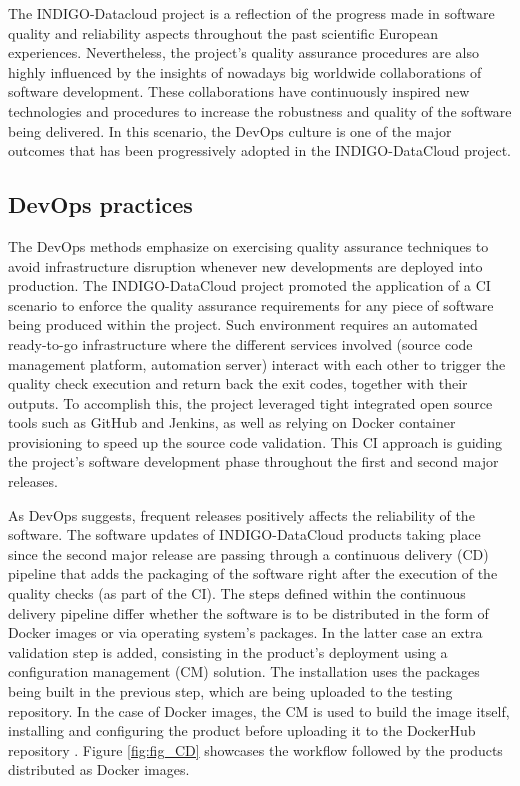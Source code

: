 \documentclass[journal]{IEEEtran}
\begin{document}
The INDIGO-Datacloud project is a reflection of the progress made in software quality and reliability aspects throughout the past scientific European experiences. Nevertheless, the project’s quality assurance procedures are also highly influenced by the insights of nowadays big worldwide collaborations of software development. These collaborations have continuously inspired new technologies and procedures to increase the robustness and quality of the software being delivered. In this scenario, the DevOps culture is one of the major outcomes that has been progressively adopted in the INDIGO-DataCloud project.

\subsection{DevOps practices}

The DevOps methods emphasize on exercising quality assurance techniques to avoid infrastructure disruption whenever new developments are deployed into production. The INDIGO-DataCloud project promoted the application of a CI scenario to enforce the quality assurance requirements for any piece of software being produced within the project. Such environment requires an automated ready-to-go infrastructure where the different services involved (source code management platform, automation server) interact with each other to trigger the quality check execution and return back the exit codes, together with their outputs. To accomplish this, the project leveraged tight integrated open source tools such as GitHub and Jenkins, as well as relying on Docker container provisioning to speed up the source code validation. This CI approach is guiding the project’s software development phase throughout the first and second major releases.

As DevOps suggests, frequent releases positively affects the reliability of the software. The software updates of INDIGO-DataCloud products taking place since the second major release are passing through a continuous delivery (CD) pipeline that adds the packaging of the software right after the execution of the quality checks (as part of the CI). The steps defined within the continuous delivery pipeline differ whether the software is to be distributed in the form of Docker images or via operating system’s packages. In the latter case an extra validation step is added, consisting in the product’s deployment using a configuration management (CM) solution. The installation uses the packages being built in the previous step, which are being uploaded to the testing repository. In the case of Docker images, the CM is used to build the image itself, installing and configuring the product before uploading it to the DockerHub repository \cite{indigo-dockerhub}. Figure \ref{fig:fig_CD} showcases the workflow followed by the products distributed as Docker images.
\end{document}
